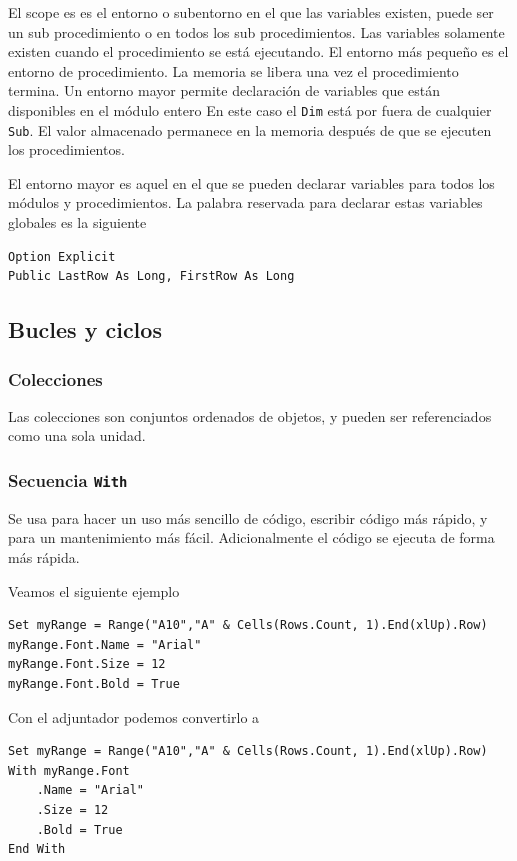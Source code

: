 El scope es es el entorno o subentorno en el que las variables existen, puede ser un sub procedimiento o en todos los sub procedimientos. Las variables solamente existen cuando el procedimiento se está ejecutando. El entorno más pequeño es el entorno de procedimiento. La memoria se libera una vez el procedimiento termina. Un entorno mayor permite declaración de variables que están disponibles en el módulo entero En este caso el \texttt{Dim} está por fuera de cualquier \texttt{Sub}. El valor almacenado permanece en la memoria después de que se ejecuten los procedimientos.

El entorno mayor es aquel en el que se pueden declarar variables para todos los módulos y procedimientos. La palabra reservada para declarar estas variables globales es la siguiente

\begin{verbatim}
Option Explicit
Public LastRow As Long, FirstRow As Long
\end{verbatim}


\subsection{Bucles y ciclos}

\subsubsection{Colecciones}

Las colecciones son conjuntos ordenados de objetos, y pueden ser referenciados como una sola unidad. 

\subsubsection{Secuencia \texttt{With}}

Se usa para hacer un uso más sencillo de código, escribir código más rápido, y para un mantenimiento más fácil. Adicionalmente el código se ejecuta de forma más rápida.

Veamos el siguiente ejemplo

\begin{verbatim}
Set myRange = Range("A10","A" & Cells(Rows.Count, 1).End(xlUp).Row)
myRange.Font.Name = "Arial"
myRange.Font.Size = 12
myRange.Font.Bold = True
\end{verbatim}

Con el adjuntador podemos convertirlo a 

\begin{verbatim}
Set myRange = Range("A10","A" & Cells(Rows.Count, 1).End(xlUp).Row)
With myRange.Font
    .Name = "Arial"
    .Size = 12
    .Bold = True
End With
\end{verbatim}

